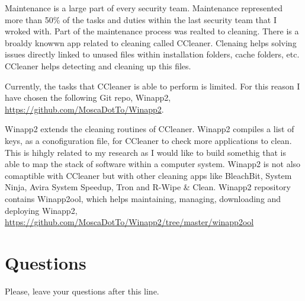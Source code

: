 \documentclass[article]{IEEEtran}
\begin{document}
Maintenance is a large part of every security team. Maintenance represented more than 50\% of the tasks and duties within the last security team that I wroked with. Part of the maintenance process was realted to cleaning. There is a broaldy knowwn app related to cleaning called CCleaner. Clenaing helps solving issues directly linked to unused files within installation folders, cache folders, etc. CCleaner helps detecting and cleaning up this files.

Currently, the tasks that CCleaner is able to perform is limited. For this reason I have chosen the following Git repo, Winapp2, \url{https://github.com/MoscaDotTo/Winapp2}.

Winapp2 extends the cleaning routines of CCleaner. Winapp2 compiles a list of keys, as a conofiguration file, for CCleaner to check more applications to clean. This is hihgly related to my research as I would like to build somethig that is able to map the stack of software within a computer system. Winapp2 is not also comaptible with CCleaner but with other cleaning apps like BleachBit, System Ninja, Avira System Speedup, Tron and R-Wipe & Clean. Winapp2 repository contains Winapp2ool, which helps maintaining, managing, downloading and deploying Winapp2, \url{https://github.com/MoscaDotTo/Winapp2/tree/master/winapp2ool}


\section{Questions}
Please, leave your questions after this line.





\end{document}
